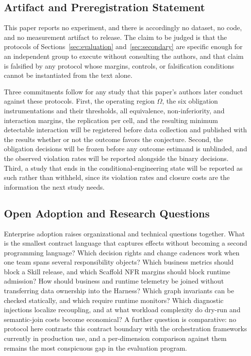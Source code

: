 \documentclass[11pt]{article}
\begin{document}
\subsection{Artifact and Preregistration Statement}

This paper reports no experiment, and there is accordingly no dataset, no code, and no measurement artifact to release. The claim to be judged is that the protocols of Sections~\ref{sec:evaluation} and~\ref{sec:secondary} are specific enough for an independent group to execute without consulting the authors, and that claim is falsified by any protocol whose margins, controls, or falsification conditions cannot be instantiated from the text alone.

Three commitments follow for any study that this paper's authors later conduct against these protocols. First, the operating region $\Omega$, the six obligation instrumentations and their thresholds, all equivalence, non-inferiority, and interaction margins, the replication per cell, and the resulting minimum detectable interaction will be registered before data collection and published with the results whether or not the outcome favors the conjecture. Second, the obligation decisions will be frozen before any outcome estimand is unblinded, and the observed violation rates will be reported alongside the binary decisions. Third, a study that ends in the conditional-engineering state will be reported as such rather than withheld, since its violation rates and closure costs are the information the next study needs.

\subsection{Open Adoption and Research Questions}

Enterprise adoption raises organizational and technical questions together. What is the smallest contract language that captures effects without becoming a second programming language? Which decision rights and change cadences work when one team spans several responsibility objects? Which business metrics should block a Skill release, and which Scaffold NFR margins should block runtime admission? How should business and runtime telemetry be joined without transferring data ownership into the Harness? Which graph invariants can be checked statically, and which require runtime monitors? Which diagnostic injections localize recoupling, and at what workload complexity do dry-run and semantic-join costs become economical? A further question is comparative: no protocol here contrasts this contract boundary with the orchestration frameworks currently in production use, and a per-dimension comparison against them remains the most conspicuous gap in the evaluation program.
\end{document}
